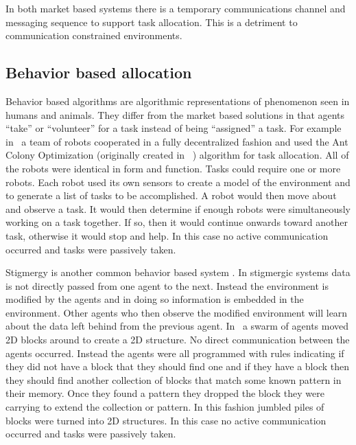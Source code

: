 In both market based systems there is a temporary communications channel and messaging sequence to support task allocation.  This is a detriment to communication constrained environments.

\subsection{Behavior based allocation}

Behavior based algorithms are algorithmic representations of phenomenon seen in humans and animals. They differ from the market based solutions in that agents ``take'' or ``volunteer'' for a task instead of being ``assigned'' a task.  For example in~\textcite{ant_colony_opt} a team of robots cooperated in a fully decentralized fashion and used the Ant Colony Optimization (originally created in ~\textcite{orig_aco}) algorithm for task allocation.  All of the robots were identical in form and function.  Tasks could require one or more robots.  Each robot used its own sensors to create a model of the environment and to generate a list of tasks to be accomplished.  A robot would then move about and observe a task.  It would then determine if enough robots were simultaneously working on a task together.  If so, then it would continue onwards toward another task, otherwise it would stop and help.  In this case no active communication occurred and tasks were passively taken.

Stigmergy is another common behavior based system \parencite{history_stigmergy} \parencite{social_cog_stigmergy}. In stigmergic systems data is not directly passed from one agent to the next.  Instead the environment is modified by the agents and in doing so information is embedded in the environment.  Other agents who then observe the modified environment will learn about the data left behind from the previous agent.  In~\textcite{stigmergy_building} a swarm of agents moved 2D blocks around to create a 2D structure.  No direct communication between the agents occurred.  Instead the agents were all programmed with rules indicating if they did not have a block that they should find one and if they have a block then they should find another collection of blocks that match some known pattern in their memory.  Once they found a pattern they dropped the block they were carrying to extend the collection or pattern.  In this fashion jumbled piles of blocks were turned into 2D structures.  In this case no active communication occurred and tasks were passively taken.

